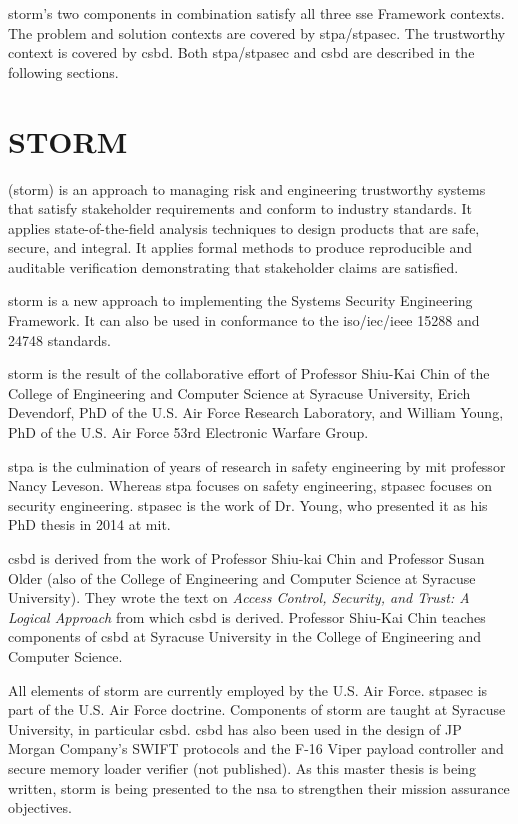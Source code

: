 \documentclass[../../main/main.tex]{subfiles}
\begin{document}
\gls{storm}'s two components in combination satisfy all three \gls{sse} Framework contexts.  The problem and solution contexts are covered by \gls{stpa}/\gls{stpasec}.  The trustworthy context is covered by \gls{csbd}.  Both \gls{stpa}/\gls{stpasec} and \gls{csbd} are described in the following sections.


\section{STORM}\label{sec:storm}

 (\gls{storm}) is an approach to managing risk and engineering trustworthy systems that satisfy stakeholder requirements and conform to industry standards.  It applies state-of-the-field analysis techniques to design products that are safe, secure, and integral.  It applies formal methods to produce reproducible and auditable verification demonstrating that stakeholder claims are satisfied.  


\gls{storm} is a new approach to implementing the Systems Security Engineering Framework.  It can also be used in conformance to the \gls{iso}/\gls{iec}/\gls{ieee} 15288 and 24748 standards.  

\gls{storm} is the result of the collaborative effort of Professor Shiu-Kai Chin of the College of Engineering and Computer Science at Syracuse University, Erich Devendorf, PhD of the U.S. Air Force Research Laboratory, and William Young, PhD of the U.S. Air Force 53rd Electronic Warfare Group.  

\gls{stpa} is the culmination of years of research in safety engineering by \Gls{mit} professor Nancy Leveson.  Whereas \gls{stpa} focuses on safety engineering, \gls{stpasec} focuses on security engineering.  \gls{stpasec} is the work of Dr. Young, who presented it as his PhD thesis in 2014 at \gls{mit}.  

\gls{csbd} is derived from the work of Professor Shiu-kai Chin and Professor Susan Older (also of the College of Engineering and Computer Science at Syracuse University).  They wrote the text on \textit{Access Control, Security, and Trust: A Logical Approach} \cite{ChinOlder} from which \gls{csbd} is derived.  Professor Shiu-Kai Chin teaches components of \gls{csbd} at Syracuse University in the College of Engineering and Computer Science.  


All elements of \gls{storm} are currently employed by the U.S. Air Force. \gls{stpasec} is part of the U.S. Air Force doctrine. Components of \gls{storm} are taught at Syracuse University, in particular \gls{csbd}. \gls{csbd} has also been used in the design of JP Morgan Company's SWIFT protocols \cite{pkm} and the F-16 Viper payload controller and secure memory loader verifier (not published). As this master thesis is being written, \gls{storm} is being presented to the \gls{nsa} to strengthen their mission assurance objectives.
\end{document}
